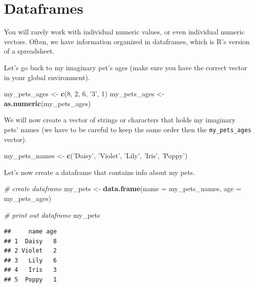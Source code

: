 \documentclass[
]{book}
\newenvironment{Shaded}{\begin{snugshade}}{\end{snugshade}}
\newcommand{\CommentTok}[1]{\textcolor[rgb]{0.56,0.35,0.01}{\textit{#1}}}
\newcommand{\DataTypeTok}[1]{\textcolor[rgb]{0.13,0.29,0.53}{#1}}
\newcommand{\DecValTok}[1]{\textcolor[rgb]{0.00,0.00,0.81}{#1}}
\newcommand{\KeywordTok}[1]{\textcolor[rgb]{0.13,0.29,0.53}{\textbf{#1}}}
\newcommand{\NormalTok}[1]{#1}
\newcommand{\StringTok}[1]{\textcolor[rgb]{0.31,0.60,0.02}{#1}}
\begin{document}
\hypertarget{dataframes}{%
\section{Dataframes}\label{dataframes}}

You will rarely work with individual numeric values, or even individual numeric vectors. Often, we have information organized in dataframes, which is R's version of a spreadsheet.

Let's go back to my imaginary pet's ages (make sure you have the correct vector in your global environment).

\begin{Shaded}
\begin{Highlighting}[]
\NormalTok{my_pets_ages <-}\StringTok{ }\KeywordTok{c}\NormalTok{(}\DecValTok{8}\NormalTok{, }\DecValTok{2}\NormalTok{, }\DecValTok{6}\NormalTok{, }\StringTok{'3'}\NormalTok{, }\DecValTok{1}\NormalTok{)}
\NormalTok{my_pets_ages <-}\StringTok{ }\KeywordTok{as.numeric}\NormalTok{(my_pets_ages)}
\end{Highlighting}
\end{Shaded}

We will now create a vector of strings or characters that holds my imaginary pets' names (we have to be careful to keep the same order then the \texttt{my\_pets\_ages} vector).

\begin{Shaded}
\begin{Highlighting}[]
\NormalTok{my_pets_names <-}\StringTok{ }\KeywordTok{c}\NormalTok{(}\StringTok{'Daisy'}\NormalTok{, }\StringTok{'Violet'}\NormalTok{, }\StringTok{'Lily'}\NormalTok{, }\StringTok{'Iris'}\NormalTok{, }\StringTok{'Poppy'}\NormalTok{)}
\end{Highlighting}
\end{Shaded}

Let's now create a dataframe that contains info about my pets.

\begin{Shaded}
\begin{Highlighting}[]
\CommentTok{# create dataframe}
\NormalTok{my_pets <-}\StringTok{ }\KeywordTok{data.frame}\NormalTok{(}\DataTypeTok{name =}\NormalTok{ my_pets_names, }\DataTypeTok{age =}\NormalTok{ my_pets_ages)}

\CommentTok{# print out dataframe}
\NormalTok{my_pets}
\end{Highlighting}
\end{Shaded}

\begin{verbatim}
##     name age
## 1  Daisy   8
## 2 Violet   2
## 3   Lily   6
## 4   Iris   3
## 5  Poppy   1
\end{verbatim}
\end{document}
